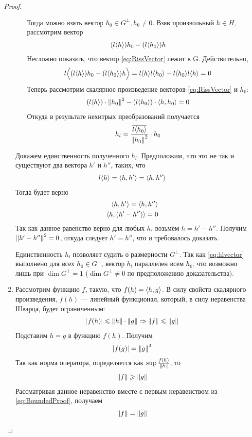 \documentclass[12pt]{article}
\begin{document}
\begin{proof}
\begin{enumerate}
\begin{enumerate}
					Тогда можно взять вектор $h_0 \in G^{\perp}, h_0 \neq 0$. Взяв произвольный $h \in H$, рассмотрим вектор
					\begin{equation} \label{eq:RissVector}
						(l\langle h \rangle) h_0 - (l\langle h_0 \rangle) h
					\end{equation}
					Несложно показать, что вектор \eqref{eq:RissVector} лежит в G. Действительно,
					$$
						l\Big\langle(l\langle h \rangle) h_0 - (l\langle h_0 \rangle) h\Big\rangle 
						= l\langle h \rangle l\langle h_0 \rangle - l\langle h_0 \rangle l\langle h \rangle = 0
					$$
					Теперь рассмотрим скалярное произведение векторов \eqref{eq:RissVector} и $h_0$:
					$$
						(l\langle h \rangle) \cdot \left\| h_0 \right\|^2 - (l\langle h_0 \rangle) \cdot \left\langle h, h_0 \right\rangle = 0
					$$
					Откуда в результате нехитрых преобразований получается 
					\begin{equation} \label{eq:hlvector}
						h_l = \frac{\overline{l\langle h_0 \rangle}}{\left\| h_0 \right\|^2} \cdot h_0
					\end{equation}
				\end{enumerate}
				Докажем единственность полученного $h_l$. Предположим, что это не так и существуют два вектора $h'$ и $h''$, таких, что 
				$$l\langle h \rangle = \left\langle h, h' \right\rangle = \left\langle h, h'' \right\rangle$$
				Тогда будет верно
				\begin{eqnarray*}
					\left\langle h, h' \right\rangle = \left\langle h, h'' \right\rangle \\
					\left\langle h, (h' - h'') \right\rangle = 0
				\end{eqnarray*}
				Так как данное равенство верно для любых $h$, возьмём $h = h' - h''$. Получим $\left\| h'-h'' \right\|^2 = 0$, откуда следует
				$h' = h''$, что и требовалось доказать.
			
				{\footnotesize
					Единственность $h_l$ позволяет судить о размерности $G^{\perp}$.
					Так как \eqref{eq:hlvector} выполнено для всех $h_0 \in G^{\perp}$, вектор $h_l$ параллелен всем $h_0$, 
					что возможно лишь при $\dim{G^{\perp}} = 1$ ($\dim{G^{\perp}} \neq 0$ по предположению доказательства).
				}
			
				\item Рассмотрим функцию $f$, такую, что $f(h) = \left\langle h, g \right\rangle$. В силу свойств скалярного произведения, 
				$f(h)$ --- линейный функционал, который, в силу неравенства Шварца, будет ограниченным:
				\begin{equation} \label{eq:BoundedProof}
					|f(h)| \leqslant \left\| h \right\| \cdot \left\| g \right\| \Rightarrow \left\| f \right\| \leqslant \left\| g \right\|
				\end{equation}
				Подставим $h = g$ в функцию $f(h)$. Получим
				$$|f(g)| = \left\| g \right\|^2$$
				Так как норма оператора, определяется как $\sup \frac{f(h)}{\left\| h \right\|}$, то 
				$$\left\| f \right\| \geqslant \left\| g \right\|$$
				Рассматривая данное неравенство вместе с первым неравенством из \eqref{eq:BoundedProof}, получаем 
				$$ \left\| f \right\| = \left\| g \right\| $$
			

\end{enumerate}
\end{proof}
\end{document}
